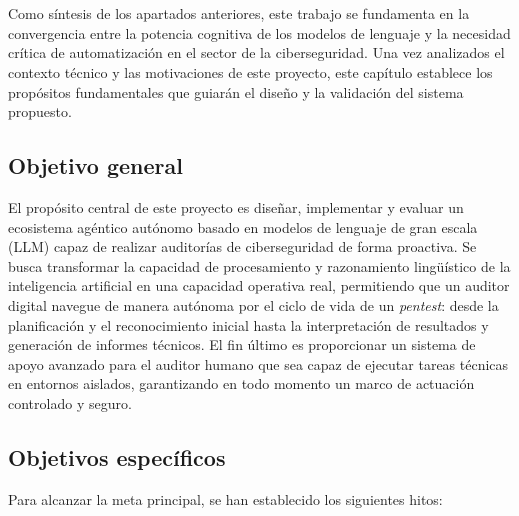 \chapter{\objectivesname} \label{sec:objetivos}

Como síntesis de los apartados anteriores, este trabajo se fundamenta en la convergencia entre la potencia cognitiva de los modelos de lenguaje y la necesidad crítica de automatización en el sector de la ciberseguridad. Una vez analizados el contexto técnico y las motivaciones de este proyecto, este capítulo establece los propósitos fundamentales que guiarán el diseño y la validación del sistema propuesto.

\section{Objetivo general}
\label{sec:objetivo_general}

El propósito central de este proyecto es diseñar, implementar y evaluar un ecosistema agéntico autónomo basado en modelos de lenguaje de gran escala (LLM) capaz de realizar auditorías de ciberseguridad de forma proactiva. Se busca transformar la capacidad de procesamiento y razonamiento lingüístico de la inteligencia artificial en una capacidad operativa real, permitiendo que un auditor digital navegue de manera autónoma por el ciclo de vida de un \textit{pentest}: desde la planificación y el reconocimiento inicial hasta la interpretación de resultados y generación de informes técnicos. El fin último es proporcionar un sistema de apoyo avanzado para el auditor humano que sea capaz de ejecutar tareas técnicas en entornos aislados, garantizando en todo momento un marco de actuación controlado y seguro.

\section{Objetivos específicos}
\label{sec:objetivos_especificos}

Para alcanzar la meta principal, se han establecido los siguientes hitos:


